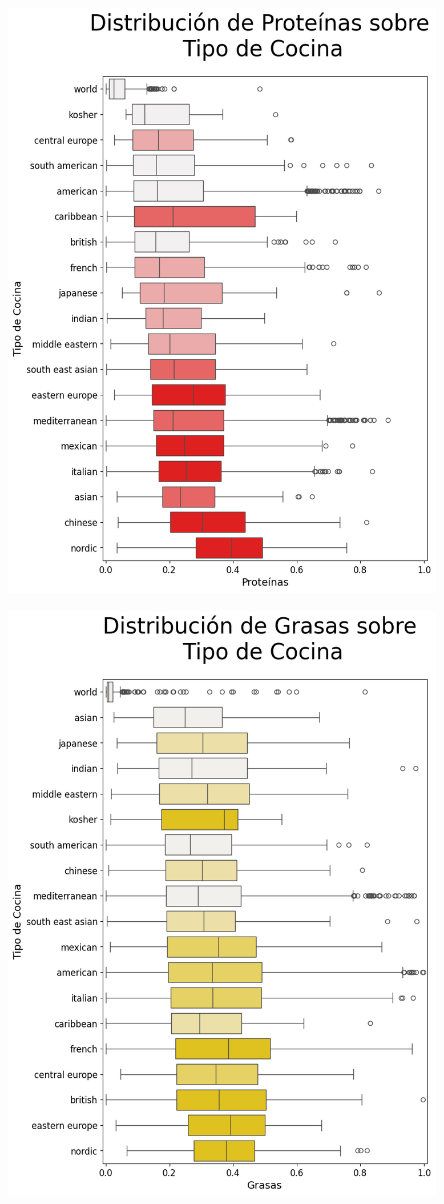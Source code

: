 \documentclass[12pt,a4paper]{article}
\begin{document}
        \begin{center}
            \includegraphics[width=0.85\textwidth]{Resources/2_02_plot_03.png}
        \end{center}

        \begin{center}
            \includegraphics[width=0.85\textwidth]{Resources/2_02_plot_04.png}
        \end{center}
\end{document}
